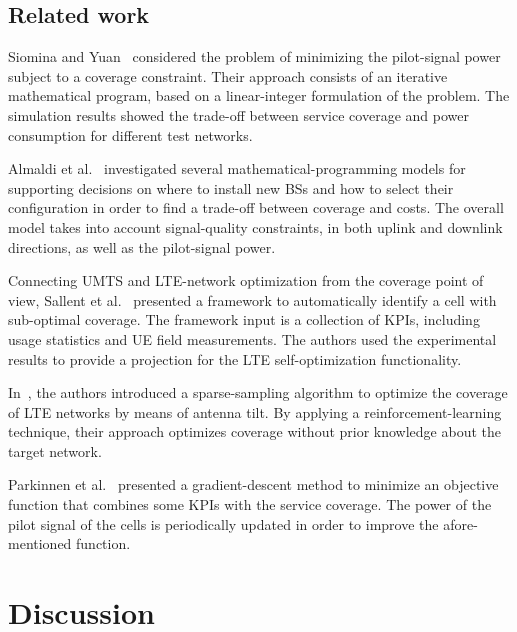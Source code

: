 \subsection{Related work}

Siomina and Yuan~\cite{Siomina:Minimum.pilot.power.for.service.coverage}
considered the problem of minimizing the pilot-signal power subject
to a coverage constraint. Their approach consists of an iterative
mathematical program, based on a linear-integer formulation of the
problem. The simulation results showed the trade-off between service
coverage and power consumption for different test networks.

Almaldi et al.~\cite{Amaldi-Radio_planning_and_coverage_optimization_of_3G_networks:2008}
investigated several mathematical-programming models for supporting
decisions on where to install new BSs and how to select their configuration
in order to find a trade-off between coverage and costs. The overall
model takes into account signal-quality constraints, in both uplink
and downlink directions, as well as the pilot-signal power.

Connecting UMTS and LTE-network optimization from the coverage point
of view, Sallent et al.~\cite{Sallent-A_roadmap_from_UMTS_to_LTE_optimization:2011}
presented a framework to automatically identify a cell with sub-optimal
coverage. The framework input is a collection of KPIs, including usage
statistics and UE field measurements. The authors used the experimental
results to provide a projection for the LTE self-optimization functionality.

In~\cite{Thampi-A_sparse_sampling_algorithm_for_self_optimisation_of_coverage_in_LTE_networks:2012},
the authors introduced a sparse-sampling algorithm to optimize the
coverage of LTE networks by means of antenna tilt. By applying a reinforcement-learning
technique, their approach optimizes coverage without prior knowledge
about the target network.

Parkinnen et al.~\cite{Coverage.optimization.with.cost.function:2002}
presented a gradient-descent method to minimize an objective function
that combines some KPIs with the service coverage. The power of the
pilot signal of the cells is periodically updated in order to improve
the afore-mentioned function.


\section{Discussion}

